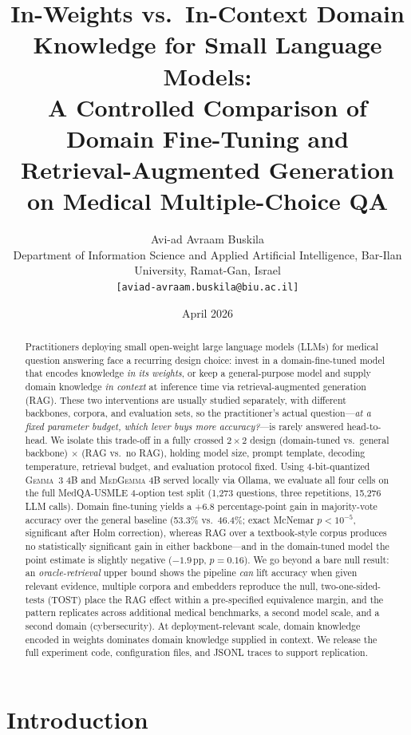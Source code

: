 \documentclass[11pt,a4paper]{article}
\title{In-Weights vs.\ In-Context Domain Knowledge for Small Language Models:\\
       A Controlled Comparison of Domain Fine-Tuning and\\
       Retrieval-Augmented Generation on Medical Multiple-Choice QA}
\author{
        Avi-ad Avraam Buskila\\
        \small Department of Information Science and Applied Artificial Intelligence, Bar-Ilan University, Ramat-Gan, Israel\\
        \small \texttt{[aviad-avraam.buskila@biu.ac.il]}
      }
\date{April 2026}
\begin{document}
\maketitle

\begin{abstract}
Practitioners deploying small open-weight large language models (LLMs) for
medical question answering face a recurring design choice: invest in a
domain-fine-tuned model that encodes knowledge \emph{in its weights}, or keep a
general-purpose model and supply domain knowledge \emph{in context} at inference
time via retrieval-augmented generation (RAG). These two interventions are
usually studied separately, with different backbones, corpora, and evaluation
sets, so the practitioner's actual question---\emph{at a fixed parameter budget,
which lever buys more accuracy?}---is rarely answered head-to-head. We isolate
this trade-off in a fully crossed $2\!\times\!2$ design (domain-tuned vs.\
general backbone) $\times$ (RAG vs.\ no RAG), holding model size, prompt
template, decoding temperature, retrieval budget, and evaluation protocol fixed.
Using 4-bit-quantized \textsc{Gemma~3 4B} and \textsc{MedGemma 4B} served locally
via Ollama, we evaluate all four cells on the full MedQA-USMLE 4-option test
split (1{,}273 questions, three repetitions, 15{,}276 LLM calls). Domain
fine-tuning yields a $+6.8$ percentage-point gain in majority-vote accuracy over
the general baseline (53.3\% vs.\ 46.4\%; exact McNemar $p<10^{-5}$, significant
after Holm correction), whereas RAG over a textbook-style corpus produces no
statistically significant gain in either backbone---and in the domain-tuned
model the point estimate is slightly negative ($-1.9$\,pp, $p=0.16$). We go
beyond a bare null result: an \emph{oracle-retrieval} upper bound shows the
pipeline \emph{can} lift accuracy when given relevant evidence, multiple corpora
and embedders reproduce the null, two-one-sided-tests (TOST) place the RAG effect
within a pre-specified equivalence margin, and the pattern replicates across
additional medical benchmarks, a second model scale, and a second domain
(cybersecurity). At deployment-relevant scale, domain knowledge encoded in
weights dominates domain knowledge supplied in context. We release the full
experiment code, configuration files, and JSONL traces to support replication.
\end{abstract}

\section{Introduction}
\end{document}
